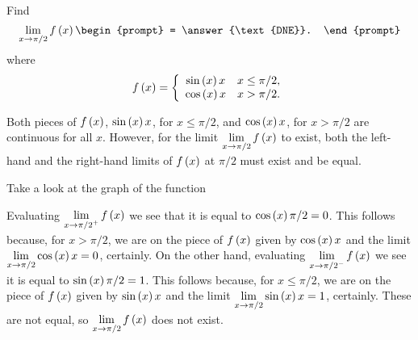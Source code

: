 \documentclass{ximera}
\author{Gregory Hartman \and Matthew Carr}
\begin{document}
\begin{exercise}



  Find 
  \[
  \lim_{x\to \pi/2} f\p{x}
  \begin{prompt}
  = \answer{\text{DNE}}.
  \end{prompt}
  \]
  where
  \[
  f\left(x\right) = \left\{\begin{array}{cl} \sin\left(x\right) x & x\leq \pi/2, \\ \cos\left(x\right) x & x>\pi/2. \end{array}\right.
  \]
    \begin{hint}
     Both pieces of $f\left(x\right)$, $\sin\left(x\right) x$, for $x\leq\pi/2$, and $\cos\left(x\right) x$, for $x>\pi/2$ are continuous for all $x$. However, for the limit $\lim_{x\to\pi/2}f\p{x}$ to exist, both the left-hand and the right-hand limits of $f\left(x\right)$ at $\pi/2$ must exist and be equal.
    \end{hint}
     \begin{hint}
    	Take a look at the graph of the function
    \begin{center}
      \end{center} 
    \end{hint}
    \begin{hint}
     Evaluating $\lim_{x\to{\pi/2}^{+}}f\p{x}$ we see that it is equal to $\cos\left(x\right) \pi/2=0$. This follows because, for $x>\pi/2$, we are on the piece of $f\left(x\right)$ given by $\cos\left(x\right) x$ and the limit $\lim_{x\to{\pi/2}}\cos\p{x} x=0$, certainly. On the other hand, evaluating $\lim_{x\to{\pi/2}^{-}}f\p{x}$ we see it is equal to $\sin\left(x\right) \pi/2=1$. This follows because, for $x\leq\pi/2$, we are on the piece of $f\left(x\right)$ given by $\sin\left(x\right) x$ and the limit $\lim_{x\to\pi/2}\sin\p{x} x=1$, certainly. These are not equal, so $\lim_{x\to\pi/2}f\p{x}$ does not exist.
    \end{hint}
\end{exercise}
\end{document}
